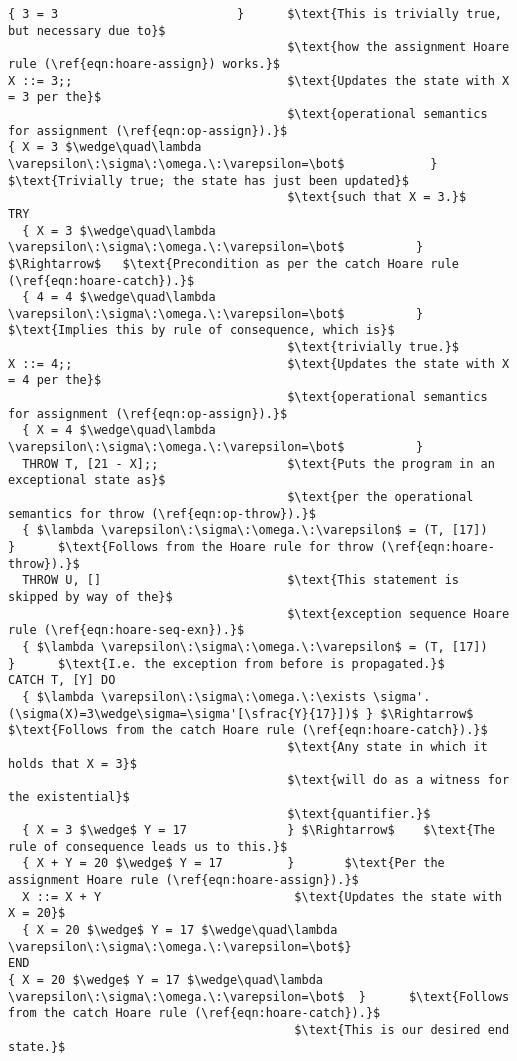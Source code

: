 \begin{lstlisting}[mathescape=true,keepspaces=true,label=lst:hoare_ex_asgn,caption=A small program demonstrating a try-catch statement.]
{ 3 = 3                         }      $\text{This is trivially true, but necessary due to}$
                                       $\text{how the assignment Hoare rule (\ref{eqn:hoare-assign}) works.}$
X ::= 3;;                              $\text{Updates the state with X = 3 per the}$
                                       $\text{operational semantics for assignment (\ref{eqn:op-assign}).}$
{ X = 3 $\wedge\quad\lambda \varepsilon\:\sigma\:\omega.\:\varepsilon=\bot$            }      $\text{Trivially true; the state has just been updated}$
                                       $\text{such that X = 3.}$
TRY
  { X = 3 $\wedge\quad\lambda \varepsilon\:\sigma\:\omega.\:\varepsilon=\bot$          } $\Rightarrow$   $\text{Precondition as per the catch Hoare rule (\ref{eqn:hoare-catch}).}$
  { 4 = 4 $\wedge\quad\lambda \varepsilon\:\sigma\:\omega.\:\varepsilon=\bot$          }      $\text{Implies this by rule of consequence, which is}$
                                       $\text{trivially true.}$
X ::= 4;;                              $\text{Updates the state with X = 4 per the}$
                                       $\text{operational semantics for assignment (\ref{eqn:op-assign}).}$
  { X = 4 $\wedge\quad\lambda \varepsilon\:\sigma\:\omega.\:\varepsilon=\bot$          }
  THROW T, [21 - X];;                  $\text{Puts the program in an exceptional state as}$
                                       $\text{per the operational semantics for throw (\ref{eqn:op-throw}).}$
  { $\lambda \varepsilon\:\sigma\:\omega.\:\varepsilon$ = (T, [17])          }      $\text{Follows from the Hoare rule for throw (\ref{eqn:hoare-throw}).}$
  THROW U, []                          $\text{This statement is skipped by way of the}$
                                       $\text{exception sequence Hoare rule (\ref{eqn:hoare-seq-exn}).}$
  { $\lambda \varepsilon\:\sigma\:\omega.\:\varepsilon$ = (T, [17])          }      $\text{I.e. the exception from before is propagated.}$
CATCH T, [Y] DO
  { $\lambda \varepsilon\:\sigma\:\omega.\:\exists \sigma'.(\sigma(X)=3\wedge\sigma=\sigma'[\sfrac{Y}{17}])$ } $\Rightarrow$    $\text{Follows from the catch Hoare rule (\ref{eqn:hoare-catch}).}$
                                       $\text{Any state in which it holds that X = 3}$
                                       $\text{will do as a witness for the existential}$
                                       $\text{quantifier.}$
  { X = 3 $\wedge$ Y = 17              } $\Rightarrow$    $\text{The rule of consequence leads us to this.}$
  { X + Y = 20 $\wedge$ Y = 17         }       $\text{Per the assignment Hoare rule (\ref{eqn:hoare-assign}).}$
  X ::= X + Y                           $\text{Updates the state with X = 20}$
  { X = 20 $\wedge$ Y = 17 $\wedge\quad\lambda \varepsilon\:\sigma\:\omega.\:\varepsilon=\bot$}
END
{ X = 20 $\wedge$ Y = 17 $\wedge\quad\lambda \varepsilon\:\sigma\:\omega.\:\varepsilon=\bot$  }      $\text{Follows from the catch Hoare rule (\ref{eqn:hoare-catch}).}$
                                        $\text{This is our desired end state.}$
\end{lstlisting}